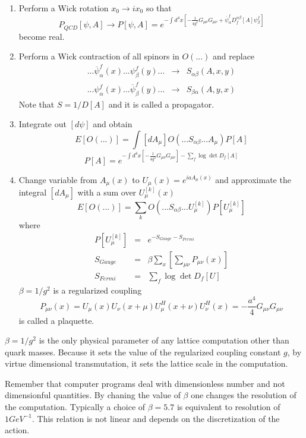 \begin{enumerate}
\item  Perform a Wick rotation $x_0\rightarrow ix_0$ so that 
\[
P_{QCD}[\psi ,A]\rightarrow P[\psi ,A]=e^{-\int d^4x\left[ -\frac
1{4g^2}G_{\mu \nu }G_{\mu \nu }+\overline{\psi }_\alpha ^fD_f^{\alpha \beta
}[A]\psi _\beta ^f\right] }
\]
become real.

\item  Perform a Wick contraction of all spinors in $O(...)$ and replace 
\begin{eqnarray*}
...\overline{\psi }_\alpha ^f(x)...\psi _\beta ^f(y)... &\rightarrow
&S_{\alpha \beta }(A,x,y) \\
...\psi _\alpha ^f(x)...\overline{\psi }_\beta ^f(y)... &\rightarrow
&S_{\beta \alpha }(A,y,x)
\end{eqnarray*}
Note that $S=1/D[A]$ and it is called a propagator.

\item  Integrate out $[d\psi ]$ and obtain 
\[
E[O(...)]=\int [dA_\mu ]O(...S_{\alpha \beta }...A_\mu )P[A]
\]
\[
P[A]=e^{-\int d^4x\left[ -\frac 1{4g^2}G_{\mu \nu }G_{\mu \nu }\right]
-\sum_f\log \det D_f[A]}
\]

\item  Change variable from $A_\mu (x)$ to $U_\mu (x)=e^{iaA_\mu (x)}$ and
approximate the integral $[dA_\mu ]$ with a sum over $U_\mu ^{[k]}(x)$%
\[
E[O(...)]=\sum_kO(...S_{\alpha \beta }...U_\mu ^{[k]})P[U_\mu ^{[k]}]
\]
where 
\begin{eqnarray*}
P[U_\mu ^{[k]}] &=&e^{-S_{Gauge}-S_{Fermi}} \\
S_{Gauge} &=&\beta \sum_x\left[ \sum_{\mu \nu }P_{\mu \nu }(x)\right]  \\
S_{Fermi} &=&\sum_f\log \det D_f[U]
\end{eqnarray*}
$\beta =1/g^2$ is a regularized coupling 
\[
P_{\mu \nu }(x)=U_\mu (x)U_\nu (x+\mu )U_\mu ^H(x+\nu )U_\nu ^H(x)=-\frac{a^4%
}4G_{\mu \nu }G_{\mu \nu }
\]
is called a plaquette.
\end{enumerate}

$\beta =1/g^2$ is the only physical parameter of any lattice computation
other than quark masses. Because it sets the value of the regularized
coupling constant $g$, by virtue dimensional transmutation, it sets the
lattice scale in the computation.

Remember that computer programs deal with dimensionless number and not
dimensionful quantities. By chaning the value of $\beta $ one changes the
resolution of the computation. Typically a choice of $\beta =5.7$ is
equivalent to resolution of $1GeV^{-1}$. This relation is not linear and
depends on the discretization of the action.

